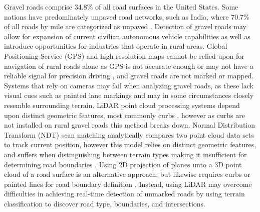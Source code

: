 \documentclass[journal,onecolumn]{IEEEtran}
\begin{document}
	{Gravel roads comprise 34.8\% \cite{road_stats_2} of all road surfaces in the United States. Some nations have predominately unpaved road networks, such as India, where 70.7\% of all roads by mile are categorized as unpaved \cite{malik_lal_2019}. Detection of gravel roads may allow for expansion of current civilian autonomous vehicle capabilities as well as introduce opportunities for industries that operate in rural areas. Global Positioning Service (GPS) and high resolution maps cannot be relied upon for navigation of rural roads alone as GPS is not accurate enough or may not have a reliable signal for precision driving \cite{noauthor_gpsgov_nodate}, and gravel roads are not marked or mapped. Systems that rely on cameras may fail when analyzing gravel roads, as these lack visual cues such as painted lane markings \cite{crisman_scarf_1993} and may in some circumstances closely resemble surrounding terrain. LiDAR point cloud processing systems depend upon distinct geometric features, most commonly curbs \cite{yadav_extraction_2017,liu_new_2013,qiu_fast_2016,fernandes_road_2014,seker_experiments_nodate,yang_semi-automated_2013,miyazaki_line-based_2014,hervieu_road_2013,smadja_road_nodate}, however as curbs are not installed on rural gravel roads \cite{skorseth_gravel_nodate} this method breaks down. Normal Distribution Transform (NDT) scan matching analytically compares two point cloud data sets to track current position, however this model relies on distinct geometric features, and suffers when distinguishing between terrain types making it insufficient for determining road boundaries \cite{biber_normal_2003}. Using 2D projection of planes unto a 3D point cloud of a road surface is an alternative approach, but likewise requires curbs or painted lines for road boundary definition \cite{fernandes_road_2014, borkar_robust_2009-1, guo_lane_2015}. Instead, using LiDAR may overcome difficulties in achieving real-time detection of unmarked roads by using terrain classification to discover road type, boundaries, and intersections.} 
	
	

	
\end{document}
